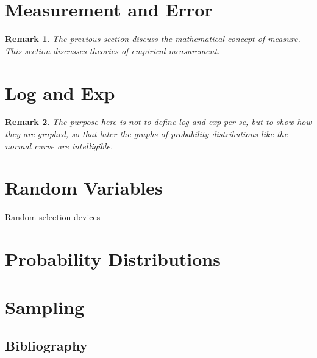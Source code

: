 \documentclass[reqno,12pt]{article}
\numberwithin{equation}{subsection}
\newtheorem{remark}{Remark}
\begin{document}
\section{Measurement and Error}

\begin{remark}
  The previous section discuss the mathematical concept of measure.
  This section discusses theories of empirical measure\textit{ment}.
\end{remark}

\section{Log and Exp}

\begin{remark}
  The purpose here is not to define log and exp per se, but to show
  how they are graphed, so that later the graphs of probability
  distributions like the normal curve are intelligible.
\end{remark}

\section{Random Variables}

Random selection devices

\section{Probability Distributions}

\section{Sampling}




\clearpage
\appendix
\begin{appendices}
\section{Bibliography}
\printbibliography[heading=none]
\end{appendices}
\end{document}
